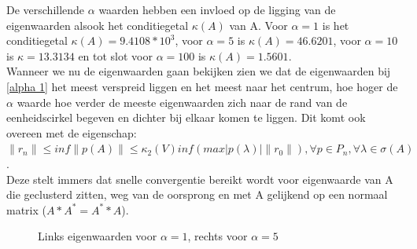 De verschillende $\alpha$ waarden hebben een invloed op de ligging van de eigenwaarden alsook het conditiegetal $\kappa(A)$ van A. Voor $\alpha = 1$ is het conditiegetal $\kappa(A) = 9.4108*10^3$, voor $\alpha = 5$ is $\kappa(A) = 46.6201$, voor $\alpha = 10$ is $\kappa = 13.3134$ en tot slot voor $\alpha = 100$ is $\kappa(A) = 1.5601$.\\[12pt]

Wanneer we nu de eigenwaarden gaan bekijken zien we dat de eigenwaarden bij \ref{alpha 1} het meest verspreid liggen en het meest naar het centrum, hoe hoger de $\alpha$ waarde hoe verder de meeste eigenwaarden zich naar de rand van de eenheidscirkel begeven en dichter bij elkaar komen te liggen. Dit komt ook overeen met de eigenschap:\\
 $\|r_{n}\| \leq inf\|p(A)\| \leq \kappa_{2}(V) inf (max |p(\lambda)|\|r_{0}\|),\forall p\in P_{n}, \forall\lambda\in \sigma(A)$.\\
 Deze stelt immers dat snelle convergentie bereikt wordt voor eigenwaarde van A die geclusterd zitten, weg van de oorsprong en met A gelijkend op een normaal matrix ($A*A^{*} = A^{*}*A$).

\begin{figure}[H]
  \centering
  \hfill
  \caption{Links eigenwaarden voor $\alpha = 1$, rechts voor $\alpha = 5$}
\end{figure}

